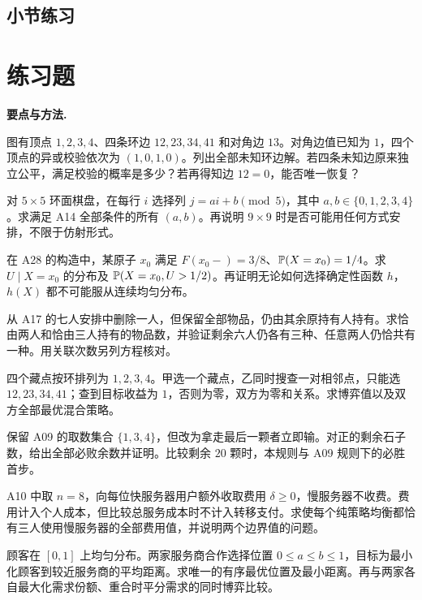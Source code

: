 

\par{}
\subsection*{小节练习}



\section{练习题}
\noindent\textbf{要点与方法.}\enspace



图有顶点 $1,2,3,4$、四条环边 $12,23,34,41$ 和对角边 $13$。对角边值已知为 $1$，四个顶点的异或校验依次为 $(1,0,1,0)$。列出全部未知环边解。若四条未知边原来独立公平，满足校验的概率是多少？若再得知边 $12=0$，能否唯一恢复？

对 $5\times5$ 环面棋盘，在每行 $i$ 选择列 $j=ai+b\pmod5$，其中 $a,b\in\{0,1,2,3,4\}$。求满足 A14 全部条件的所有 $(a,b)$。再说明 $9\times9$ 时是否可能用任何方式安排，不限于仿射形式。

在 A28 的构造中，某原子 $x_0$ 满足 $F(x_0-)=3/8$、$\mathbb{P}(X=x_0)=1/4$。求 $U\mid X=x_0$ 的分布及 $\mathbb{P}(X=x_0,U>1/2)$。再证明无论如何选择确定性函数 $h$，$h(X)$ 都不可能服从连续均匀分布。

从 A17 的七人安排中删除一人，但保留全部物品，仍由其余原持有人持有。求恰由两人和恰由三人持有的物品数，并验证剩余六人仍各有三种、任意两人仍恰共有一种。用关联次数另列方程核对。

\pagebreak
{}
四个藏点按环排列为 $1,2,3,4$。甲选一个藏点，乙同时搜查一对相邻点，只能选 $12,23,34,41$；查到目标收益为 $1$，否则为零，双方为零和关系。求博弈值以及双方全部最优混合策略。

保留 A09 的取数集合 $\{1,3,4\}$，但改为拿走最后一颗者立即输。对正的剩余石子数，给出全部必败余数并证明。比较剩余 $20$ 颗时，本规则与 A09 规则下的必胜首步。

A10 中取 $n=8$，向每位快服务器用户额外收取费用 $\delta\ge0$，慢服务器不收费。费用计入个人成本，但比较总服务成本时不计入转移支付。求使每个纯策略均衡都恰有三人使用慢服务器的全部费用值，并说明两个边界值的问题。

顾客在 $[0,1]$ 上均匀分布。两家服务商合作选择位置 $0\le a\le b\le1$，目标为最小化顾客到较近服务商的平均距离。求唯一的有序最优位置及最小距离。再与两家各自最大化需求份额、重合时平分需求的同时博弈比较。

